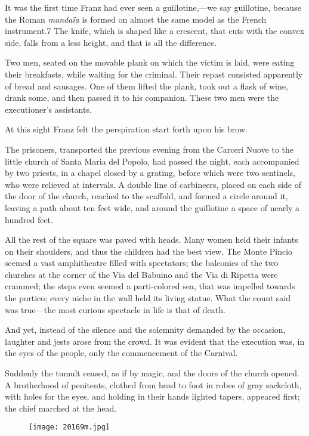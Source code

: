 It was the first time Franz had ever seen a guillotine,—we say
guillotine, because the Roman \textit{mandaïa} is formed on almost the same
model as the French instrument.7 The knife, which is shaped like a
crescent, that cuts with the convex side, falls from a less height, and
that is all the difference.

Two men, seated on the movable plank on which the victim is laid, were
eating their breakfasts, while waiting for the criminal. Their repast
consisted apparently of bread and sausages. One of them lifted the
plank, took out a flask of wine, drank some, and then passed it to his
companion. These two men were the executioner’s assistants.

At this sight Franz felt the perspiration start forth upon his brow.

The prisoners, transported the previous evening from the Carceri Nuove
to the little church of Santa Maria del Popolo, had passed the night,
each accompanied by two priests, in a chapel closed by a grating,
before which were two sentinels, who were relieved at intervals. A
double line of carbineers, placed on each side of the door of the
church, reached to the scaffold, and formed a circle around it, leaving
a path about ten feet wide, and around the guillotine a space of nearly
a hundred feet.

All the rest of the square was paved with heads. Many women held their
infants on their shoulders, and thus the children had the best view.
The Monte Pincio seemed a vast amphitheatre filled with spectators; the
balconies of the two churches at the corner of the Via del Babuino and
the Via di Ripetta were crammed; the steps even seemed a parti-colored
sea, that was impelled towards the portico; every niche in the wall
held its living statue. What the count said was true—the most curious
spectacle in life is that of death.

And yet, instead of the silence and the solemnity demanded by the
occasion, laughter and jests arose from the crowd. It was evident that
the execution was, in the eyes of the people, only the commencement of
the Carnival.

Suddenly the tumult ceased, as if by magic, and the doors of the church
opened. A brotherhood of penitents, clothed from head to foot in robes
of gray sackcloth, with holes for the eyes, and holding in their hands
lighted tapers, appeared first; the chief marched at the head.

\begin{figure}[ht]
\texttt{[image: 20169m.jpg]}
\end{figure}

